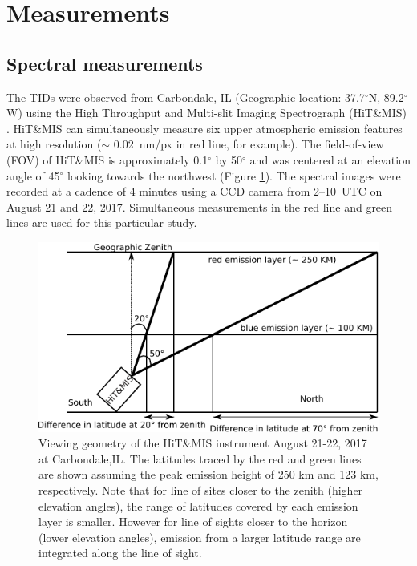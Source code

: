 \documentclass[crop=false,class=mitthesis,oneside,font=12pt]{standalone}
\begin{document}
\section{Measurements}

\subsection{Spectral measurements}

The TIDs were observed from Carbondale, IL (Geographic location: 37.7$^\circ$N, 89.2$^\circ$W) using the High Throughput and Multi-slit Imaging Spectrograph (HiT\&MIS) \citep{hitmis}. HiT\&MIS can simultaneously measure six upper atmospheric emission features at high resolution ($\sim$ 0.02~nm/px in red line, for example). The field-of-view (FOV) of HiT\&MIS is approximately 0.1$^\circ$ by 50$^\circ$ and was centered at an elevation angle of 45$^\circ$ looking towards the northwest (Figure \ref{fig:elayer}). The spectral images were recorded at a cadence of 4 minutes using a CCD camera from 2--10~UTC on August 21 and 22, 2017. Simultaneous measurements in the red line and green lines are used for this particular study. 

\begin{figure}[H]
	\centering\includegraphics[width=30pc]{elayer.pdf}
	\caption{Viewing geometry of the HiT\&MIS instrument August 21-22, 2017 at Carbondale,IL. The latitudes traced by the red and green lines are shown assuming the peak emission height of 250 km and 123 km, respectively. Note that for line of sites closer to the zenith (higher elevation angles), the range of latitudes covered by each emission layer is smaller. However for line of sights closer to the horizon (lower elevation angles), emission from a larger latitude range are integrated along the line of sight.}
	\label{fig:elayer}
\end{figure}
\end{document}
